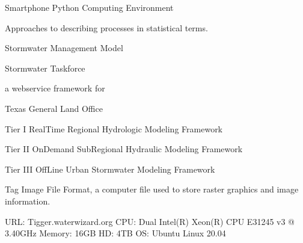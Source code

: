 \documentclass[letterpaper,12pt,english,openany,oneside]{sphinxmanual}
\begin{document}
\begin{description}
\sphinxAtStartPar
Smartphone Python Computing Environment

\sphinxAtStartPar
Approaches to describing processes in statistical terms.

\sphinxAtStartPar
Stormwater Management Model

\sphinxAtStartPar
Stormwater Taskforce

\sphinxAtStartPar
a webservice {\hyperref[\detokenize{glossary:term-API}]{}} framework for {\hyperref[\detokenize{glossary:term-Django}]{}}

\sphinxAtStartPar
Texas General Land Office

\sphinxAtStartPar
Tier I Real\sphinxhyphen{}Time Regional Hydrologic Modeling Framework

\sphinxAtStartPar
Tier II On\sphinxhyphen{}Demand Sub\sphinxhyphen{}Regional Hydraulic Modeling Framework

\sphinxAtStartPar
Tier III Off\sphinxhyphen{}Line Urban Stormwater Modeling Framework

\sphinxAtStartPar
Tag Image File Format, a computer file used to store raster graphics and image information.

\sphinxAtStartPar
URL: Tigger.water\sphinxhyphen{}wizard.org CPU: Dual Intel(R) Xeon(R) CPU E3\sphinxhyphen{}1245 v3 @ 3.40GHz Memory: 16GB HD: 4TB OS: Ubuntu Linux 20.04


\end{description}
\end{document}
